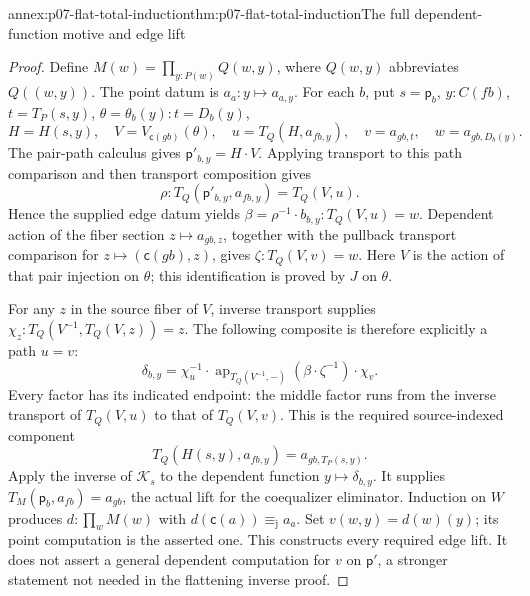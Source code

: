 \begin{annexitem}{annex:p07-flat-total-induction}{thm:p07-flat-total-induction}{The full dependent-function motive and edge lift}
\begin{proof}
Define \(M(w)=\prod_{y:P(w)}Q(w,y)\), where \(Q(w,y)\)
abbreviates \(Q((w,y))\). The point datum is
\(a_a:y\mapsto a_{a,y}\).
For each \(b\), put \(s=\mathsf p_b\), \(y:C(fb)\),
\(t=T_P(s,y)\), \(\theta=\theta_b(y):t=D_b(y)\),
\[
H=H(s,y),\quad V=V_{\mathsf c(gb)}(\theta),\quad
u=T_Q(H,a_{fb,y}),\quad v=a_{gb,t},\quad w=a_{gb,D_b(y)}.
\]
The pair-path calculus gives \(\mathsf p'_{b,y}=H\cdot V\).
Applying transport to this path comparison and then transport
composition gives
\[
\rho:T_Q(\mathsf p'_{b,y},a_{fb,y})=T_Q(V,u).
\]
Hence the supplied edge datum yields
\(\beta=\rho^{-1}\cdot b_{b,y}:T_Q(V,u)=w\).
Dependent action of the fiber section \(z\mapsto a_{gb,z}\),
together with the pullback transport comparison for
\(z\mapsto(\mathsf c(gb),z)\), gives
\(\zeta:T_Q(V,v)=w\).
Here \(V\) is the action of that pair injection on \(\theta\);
this identification is proved by \(J\) on \(\theta\).

For any \(z\) in the source fiber of \(V\), inverse transport supplies
\(\chi_z:T_Q(V^{-1},T_Q(V,z))=z\).
The following composite is therefore explicitly a path \(u=v\):
\[
\delta_{b,y}=
\chi_u^{-1}\cdot
\operatorname{ap}_{T_Q(V^{-1},-)}(\beta\cdot\zeta^{-1})
\cdot\chi_v.
\]
Every factor has its indicated endpoint: the middle factor runs from
the inverse transport of \(T_Q(V,u)\) to that of \(T_Q(V,v)\).
This is the required source-indexed component
\[
T_Q(H(s,y),a_{fb,y})=a_{gb,T_P(s,y)}.
\]
Apply the inverse of \(\mathcal K_s\) to the dependent function
\(y\mapsto\delta_{b,y}\). It supplies
\(T_M(\mathsf p_b,a_{fb})=a_{gb}\), the actual lift for the
coequalizer eliminator.
Induction on \(W\) produces \(d:\prod_wM(w)\) with
\(d(\mathsf c(a))\equiv_{\mathrm j}a_a\).
Set \(v(w,y)=d(w)(y)\); its point computation is the asserted one.
This constructs every required edge lift. It does not assert a
general dependent computation for \(v\) on \(\mathsf p'\), a
stronger statement not needed in the flattening inverse proof.
\end{proof}
\end{annexitem}

